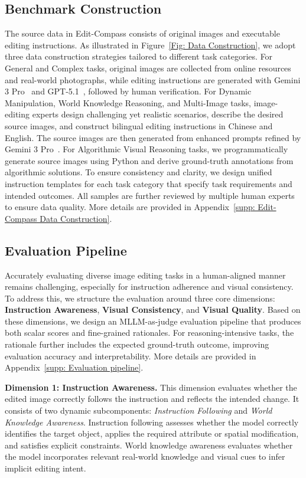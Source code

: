 \documentclass{llmxive}
\providecommand{\bench}{Edit-Compass}
\begin{document}
\subsection{Benchmark Construction}
The source data in {\bench} consists of original images and executable editing instructions. As illustrated in Figure~\ref{Fig: Data Construction}, we adopt three data construction strategies tailored to different task categories.
For General and Complex tasks, original images are collected from online resources and real-world photographs, while editing instructions are generated with Gemini 3 Pro~\cite{gemini3pro} and GPT-5.1~\cite{gpt4o20250325}, followed by human verification. For Dynamic Manipulation, World Knowledge Reasoning, and Multi-Image tasks, image-editing experts design challenging yet realistic scenarios, describe the desired source images, and construct bilingual editing instructions in Chinese and English. The source images are then generated from enhanced prompts refined by Gemini 3 Pro~\cite{gemini3pro}. For Algorithmic Visual Reasoning tasks, we programmatically generate source images using Python and derive ground-truth annotations from algorithmic solutions.
To ensure consistency and clarity, we design unified instruction templates for each task category that specify task requirements and intended outcomes. All samples are further reviewed by multiple human experts to ensure data quality. More details are provided in Appendix~\ref{supp: Edit-Compass Data Construction}.

\subsection{Evaluation Pipeline}
Accurately evaluating diverse image editing tasks in a human-aligned manner remains challenging, especially for instruction adherence and visual consistency. To address this, we structure the evaluation around three core dimensions: \textbf{Instruction Awareness}, \textbf{Visual Consistency}, and \textbf{Visual Quality}. Based on these dimensions, we design an MLLM-as-judge evaluation pipeline that produces both scalar scores and fine-grained rationales. For reasoning-intensive tasks, the rationale further includes the expected ground-truth outcome, improving evaluation accuracy and interpretability. More details are provided in Appendix~\ref{supp: Evaluation pipeline}.

\textbf{Dimension 1: Instruction Awareness.}
This dimension evaluates whether the edited image correctly follows the instruction and reflects the intended change. It consists of two dynamic subcomponents: \textit{Instruction Following} and \textit{World Knowledge Awareness}. Instruction following assesses whether the model correctly identifies the target object, applies the required attribute or spatial modification, and satisfies explicit constraints. World knowledge awareness evaluates whether the model incorporates relevant real-world knowledge and visual cues to infer implicit editing intent.
\end{document}
